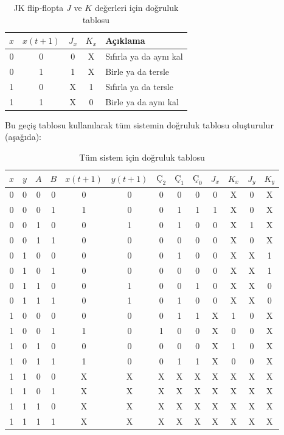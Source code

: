 \begin{ornek}[B.17]
\begin{table}[H]
\centering
\caption*{JK flip-flopta $J$ ve $K$ değerleri için doğruluk tablosu}
\begin{tabular}{cc|cc|l}
\toprule
$x$ & $x(t+1)$ & $J_x$ & $K_x$ & \textbf{Açıklama} \\
\midrule
0 & 0 & 0 & X & Sıfırla ya da aynı kal \\
0 & 1 & 1 & X & Birle ya da tersle \\
1 & 0 & X & 1 & Sıfırla ya da tersle \\
1 & 1 & X & 0 & Birle ya da aynı kal \\
\bottomrule
\end{tabular}
\end{table}

Bu geçiş tablosu kullanılarak tüm sistemin doğruluk tablosu oluşturulur (aşağıda):

\begin{table}[H]
\centering
\caption*{Tüm sistem için doğruluk tablosu}
\small
\begin{tabular}{cccc|cc|ccc|cccc}
\toprule
$x$ & $y$ & $A$ & $B$ & $x(t+1)$ & $y(t+1)$ & $\text{Ç}_2$ & $\text{Ç}_1$ & $\text{Ç}_0$ & $J_x$ & $K_x$ & $J_y$ & $K_y$ \\
\midrule
0 & 0 & 0 & 0 & 0 & 0 & 0 & 0 & 0 & 0 & X & 0 & X \\
0 & 0 & 0 & 1 & 1 & 0 & 0 & 1 & 1 & 1 & X & 0 & X \\
0 & 0 & 1 & 0 & 0 & 1 & 0 & 1 & 0 & 0 & X & 1 & X \\
0 & 0 & 1 & 1 & 0 & 0 & 0 & 0 & 0 & 0 & X & 0 & X \\
0 & 1 & 0 & 0 & 0 & 0 & 0 & 1 & 0 & 0 & X & X & 1 \\
0 & 1 & 0 & 1 & 0 & 0 & 0 & 0 & 0 & 0 & X & X & 1 \\
0 & 1 & 1 & 0 & 0 & 1 & 0 & 0 & 1 & 0 & X & X & 0 \\
0 & 1 & 1 & 1 & 0 & 1 & 0 & 1 & 0 & 0 & X & X & 0 \\
1 & 0 & 0 & 0 & 0 & 0 & 0 & 1 & 1 & X & 1 & 0 & X \\
1 & 0 & 0 & 1 & 1 & 0 & 1 & 0 & 0 & X & 0 & 0 & X \\
1 & 0 & 1 & 0 & 0 & 0 & 0 & 0 & 0 & X & 1 & 0 & X \\
1 & 0 & 1 & 1 & 1 & 0 & 0 & 1 & 1 & X & 0 & 0 & X \\
1 & 1 & 0 & 0 & X & X & X & X & X & X & X & X & X \\
1 & 1 & 0 & 1 & X & X & X & X & X & X & X & X & X \\
1 & 1 & 1 & 0 & X & X & X & X & X & X & X & X & X \\
1 & 1 & 1 & 1 & X & X & X & X & X & X & X & X & X \\
\bottomrule
\end{tabular}
\end{table}


\end{ornek}
